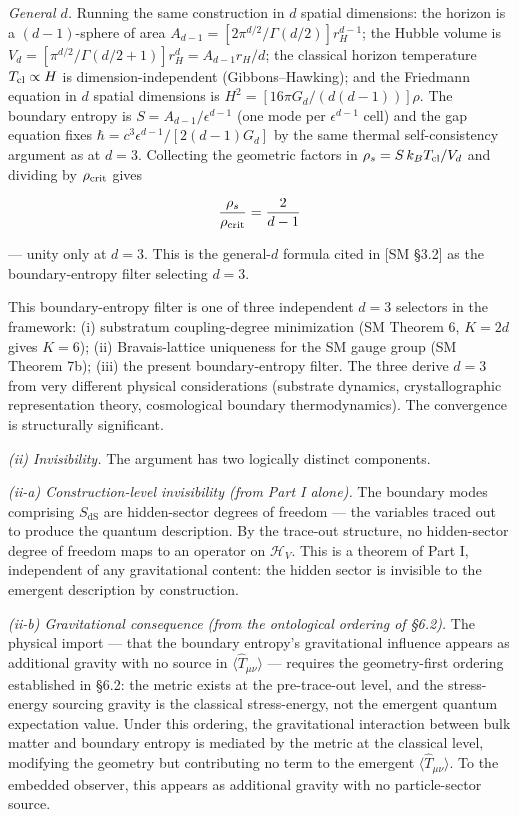\documentclass[
]{article}
\begin{document}
\emph{General \(d\).} Running the same construction in \(d\) spatial
dimensions: the horizon is a \((d-1)\)-sphere of area
\(A_{d-1} = [2\pi^{d/2}/\Gamma(d/2)] r_H^{d-1}\); the Hubble volume is
\(V_d = [\pi^{d/2}/\Gamma(d/2+1)] r_H^d = A_{d-1} r_H / d\); the
classical horizon temperature \(T_{\rm cl} \propto H\) is
dimension-independent (Gibbons--Hawking); and the Friedmann equation in
\(d\) spatial dimensions is \(H^2 = [16\pi G_d/(d(d-1))]\rho\). The
boundary entropy is \(S = A_{d-1}/\epsilon^{d-1}\) (one mode per
\(\epsilon^{d-1}\) cell) and the gap equation fixes
\(\hbar = c^3\epsilon^{d-1}/[2(d-1)G_d]\) by the same thermal
self-consistency argument as at \(d=3\). Collecting the geometric
factors in \(\rho_s = S\,k_B T_{\rm cl}/V_d\) and dividing by
\(\rho_{\rm crit}\) gives

\[\frac{\rho_s}{\rho_{\rm crit}} = \frac{2}{d-1}\]

--- unity only at \(d=3\). This is the general-\(d\) formula cited in
{[}SM §3.2{]} as the boundary-entropy filter selecting \(d=3\).

This boundary-entropy filter is one of three independent \(d=3\)
selectors in the framework: (i) substratum coupling-degree minimization
(SM Theorem 6, \(K = 2d\) gives \(K=6\)); (ii) Bravais-lattice
uniqueness for the SM gauge group (SM Theorem 7b); (iii) the present
boundary-entropy filter. The three derive \(d=3\) from very different
physical considerations (substrate dynamics, crystallographic
representation theory, cosmological boundary thermodynamics). The
convergence is structurally significant.

\emph{(ii) Invisibility.} The argument has two logically distinct
components.

\emph{(ii-a) Construction-level invisibility (from Part I alone).} The
boundary modes comprising \(S_{\text{dS}}\) are hidden-sector degrees of
freedom --- the variables traced out to produce the quantum description.
By the trace-out structure, no hidden-sector degree of freedom maps to
an operator on \(\mathcal{H}_V\). This is a theorem of Part I,
independent of any gravitational content: the hidden sector is invisible
to the emergent description by construction.

\emph{(ii-b) Gravitational consequence (from the ontological ordering of
§6.2).} The physical import --- that the boundary entropy's
gravitational influence appears as additional gravity with no source in
\(\langle \hat{T}_{\mu\nu} \rangle\) --- requires the geometry-first
ordering established in §6.2: the metric exists at the pre-trace-out
level, and the stress-energy sourcing gravity is the classical
stress-energy, not the emergent quantum expectation value. Under this
ordering, the gravitational interaction between bulk matter and boundary
entropy is mediated by the metric at the classical level, modifying the
geometry but contributing no term to the emergent
\(\langle \hat{T}_{\mu\nu} \rangle\). To the embedded observer, this
appears as additional gravity with no particle-sector source.
\end{document}
